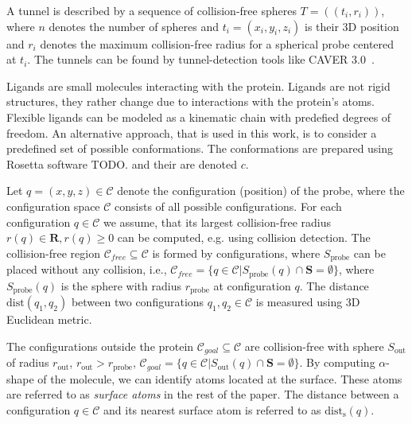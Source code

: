 \documentclass{llncs}
\def\C{\mathcal{C}}
\def\CF{\mathcal{C}_{free}}
\def\dist{\mathrm{dist}}
\def\dists{\mathrm{dist}_{\mathrm{s}}}
\def\probe{r_{\mathrm{probe}}}
\def\Sprobe{S_{\mathrm{probe}}}
\def\gprobe{r_{\mathrm{out}}}
\def\Sgprobe{S_{\mathrm{out}}}
\def\CG{\mathcal{C}_{goal}}
\def\SS{\mathbf{S}}
\begin{document}
A tunnel is described by a sequence of collision-free spheres $T=( (t_i, r_i) )$, where $n$ denotes the number of spheres and
$t_i=(x_i,y_i,z_i)$ is their 3D position and $r_i$ denotes the maximum collision-free radius for a spherical probe centered
at $t_i$. 
The tunnels can be found by tunnel-detection tools like CAVER 3.0~\cite{caver3}.

Ligands are small molecules interacting with the protein. 
Ligands are not rigid structures, they rather change due to interactions with the protein's atoms.
Flexible ligands can be modeled as a kinematic chain with predefied degrees of freedom.
An alternative approach, that is used in this work, is to consider a predefined set of possible conformations.
The conformations are prepared using Rosetta software TODO. and their are denoted $c$.

Let $q=(x,y,z)\in\C$ denote the configuration (position) of the probe, where
the configuration space $\C$ consists of all possible configurations.
For each configuration $q\in\C$ we assume, that its largest collision-free radius $r(q) \in \mathbf{R}, r(q)\ge 0$ can be computed, e.g.
using collision detection.
The collision-free region $\CF \subseteq \C$ is formed by configurations, where $\Sprobe$ can be placed without any collision, i.e., 
$\CF = \{q \in \C | \Sprobe(q) \cap \SS = \emptyset\}$, where $\Sprobe(q)$ is the sphere with radius $\probe$ at configuration $q$.
The distance $\dist(q_1,q_2)$  between two configurations $q_1,q_2\in\C$ is measured using 3D Euclidean metric.

The configurations outside the protein $\CG \subseteq \C$ are collision-free with sphere $\Sgprobe$ of radius $\gprobe$, $\gprobe> \probe$,
$\CG=\{q\in \C| \Sgprobe(q) \cap \SS = \emptyset \}$.
By computing $\alpha$-shape of the molecule, we can identify atoms located at the surface. 
These atoms are referred to as {\sl surface atoms} in the rest of the paper.
The distance between a configuration $q \in \C$ and its nearest surface atom is referred to as $\dists(q)$.
\end{document}
